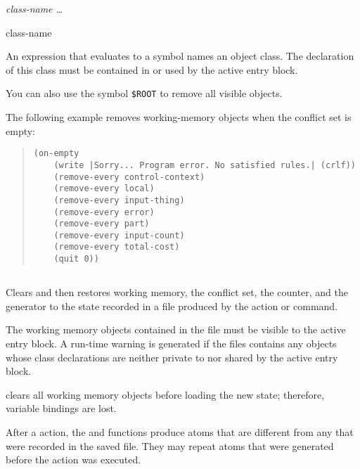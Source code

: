 {{\Format

 \it{class-name} \ldots

\begin{arguments}
\item[class-name]

  An expression that evaluates to a symbol names an object class. The
  declaration of this class must be contained in or used by the active
  entry block.

  You can also use the symbol
  \verb|$ROOT| to remove all visible objects.
\end{arguments}

\Example

The following example removes working-memory objects when the conflict
set is empty:

\begin{quote}
\begin{verbatim}
(on-empty
    (write |Sorry... Program error. No satisfied rules.| (crlf))
    (remove-every control-context)
    (remove-every local)
    (remove-every input-thing)
    (remove-every error)
    (remove-every part)
    (remove-every input-count)
    (remove-every total-cost)
    (quit 0))
\end{verbatim}
\end{quote}

\subsection{}

Clears and then restores working memory, the conflict set, the 
counter, and the  generator to the state recorded in a file
produced by the  action or command.

The working memory objects contained in the  file must be
visible to the active entry block. A run-time warning is generated if
the files contains any objects whose class declarations are neither
private to nor shared by the active entry block.

 clears all working memory objects before loading the
new state; therefore, variable bindings are lost.

After a  action, the  and  functions
produce atoms that are different from any that were recorded
in the saved file. They may repeat atoms that were generated
before the  action was executed.

}}
